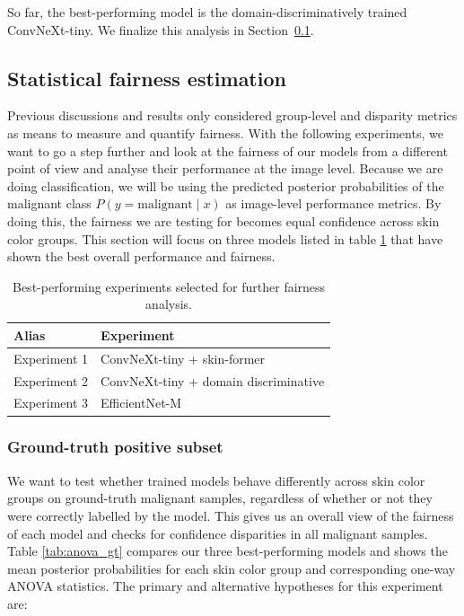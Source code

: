 So far, the best-performing model is the domain-discriminatively trained ConvNeXt-tiny. We finalize this analysis in Section~\ref{subsec:statistical_fairness}.



\subsection{Statistical fairness estimation}
\label{subsec:statistical_fairness}

Previous discussions and results only considered group-level and disparity metrics as means to measure and quantify fairness. With the following experiments, we want to go a step further and look at the fairness of our models from a different point of view and analyse their performance at the image level. Because we are doing classification, we will be using the predicted posterior probabilities of the malignant class $P(y=\text{malignant} \mid x)$ as image-level performance metrics. By doing this, the fairness we are testing for becomes equal confidence across skin color groups. This section will focus on three models listed in table \ref{tab:anova_experiments} that have shown the best overall performance and fairness.  

\begin{table}[htpb]
\centering
\caption{Best-performing experiments selected for further fairness analysis.}
\label{tab:anova_experiments}

\begin{tabular}{ll}
\toprule
\textbf{Alias} & \textbf{Experiment} \\ \midrule
Experiment 1   &  ConvNeXt-tiny + skin-former  \\
Experiment 2   &  ConvNeXt-tiny + domain discriminative \\
Experiment 3   &  EfficientNet-M  \\ \bottomrule
\end{tabular}
\end{table}

\subsubsection{Ground-truth positive subset}

We want to test whether trained models behave differently across skin color groups on ground-truth malignant samples, regardless of whether or not they were correctly labelled by the model. This gives us an overall view of the fairness of each model and checks for confidence disparities in all malignant samples. Table \ref{tab:anova_gt} compares our three best-performing models and shows the mean posterior probabilities for each skin color group and corresponding one-way ANOVA statistics. The primary and alternative hypotheses for this experiment are:

